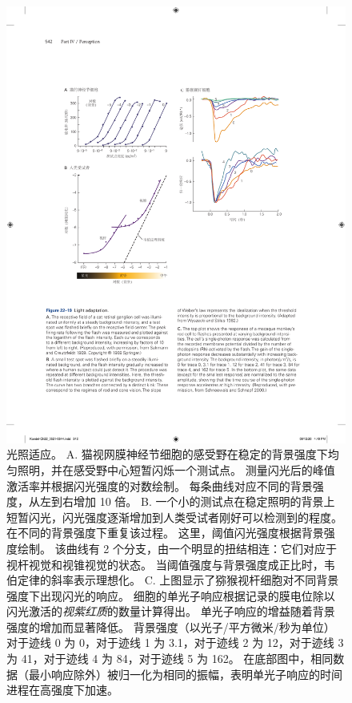 \begin{figure}[htbp]
	\centering
	\includegraphics[width=1.0\linewidth]{chap22/fig_22_19}
	\caption{光照适应。
		A. 猫视网膜神经节细胞的感受野在稳定的背景强度下均匀照明，并在感受野中心短暂闪烁一个测试点。 
		测量闪光后的峰值激活率并根据闪光强度的对数绘制。
		每条曲线对应不同的背景强度，从左到右增加 10 倍\cite{sakmann1969scotopic}。
		B. 一个小的测试点在稳定照明的背景上短暂闪光，闪光强度逐渐增加到人类受试者刚好可以检测到的程度。
		在不同的背景强度下重复该过程。
		这里，阈值闪光强度根据背景强度绘制。
		该曲线有 2 个分支，由一个明显的扭结相连：它们对应于视杆视觉和视锥视觉的状态。
		当阈值强度与背景强度成正比时，韦伯定律的斜率表示理想化\cite{wyszecki2000color}。
		C. 上图显示了猕猴视杆细胞对不同背景强度下出现闪光的响应。
		细胞的单光子响应根据记录的膜电位除以闪光激活的\textit{视紫红质}的数量计算得出。
		单光子响应的增益随着背景强度的增加而显著降低。
		背景强度（以光子/平方微米/秒为单位）对于迹线 0 为 0，对于迹线 1 为 3.1，对于迹线 2 为 12，对于迹线 3 为 41，对于迹线 4 为 84，对于迹线 5 为 162。
		在底部图中，相同数据（最小响应除外）被归一化为相同的振幅，表明单光子响应的时间进程在高强度下加速\cite{schneeweis2000noise}。}
	\label{fig:22_19}
\end{figure}


